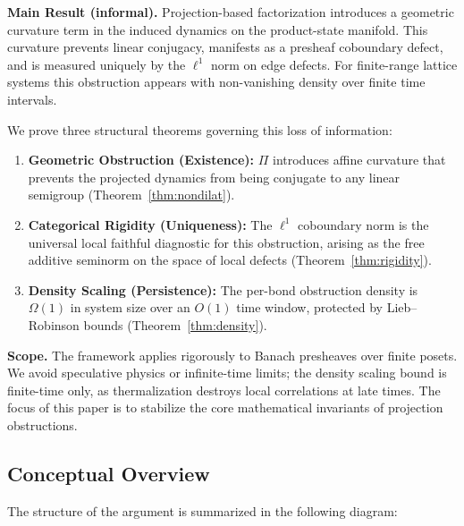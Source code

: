 \documentclass[12pt,a4paper]{amsart}
\theoremstyle{plain}
\theoremstyle{definition}
\theoremstyle{remark}
\begin{document}
\medskip
\noindent\textbf{Main Result (informal).}
Projection-based factorization introduces a geometric curvature term
in the induced dynamics on the product-state manifold. This curvature
prevents linear conjugacy, manifests as a presheaf coboundary defect,
and is measured uniquely by the $\ell^1$ norm on edge defects. For
finite-range lattice systems this obstruction appears with
non-vanishing density over finite time intervals.

\medskip
We prove three structural theorems governing this loss of information:
\begin{enumerate}[label=\textbf{\arabic*.},leftmargin=2em]
  \item \textbf{Geometric Obstruction (Existence):}
    $\Pi$ introduces affine curvature that prevents the projected
    dynamics from being conjugate to any linear semigroup
    (Theorem~\ref{thm:nondilat}).
  \item \textbf{Categorical Rigidity (Uniqueness):}
    The $\ell^1$ coboundary norm is the universal local faithful
    diagnostic for this obstruction, arising as the free additive
    seminorm on the space of local defects
    (Theorem~\ref{thm:rigidity}).
  \item \textbf{Density Scaling (Persistence):}
    The per-bond obstruction density is $\Omega(1)$ in system size
    over an $O(1)$ time window, protected by Lieb--Robinson bounds
    (Theorem~\ref{thm:density}).
\end{enumerate}

\noindent\textbf{Scope.}
The framework applies rigorously to Banach presheaves over finite
posets. We avoid speculative physics or infinite-time limits; the
density scaling bound is finite-time only, as thermalization destroys
local correlations at late times. The focus of this paper is to
stabilize the core mathematical invariants of projection obstructions.


\subsection{Conceptual Overview}\label{sec:overview}

The structure of the argument is summarized in the following diagram:
\end{document}
